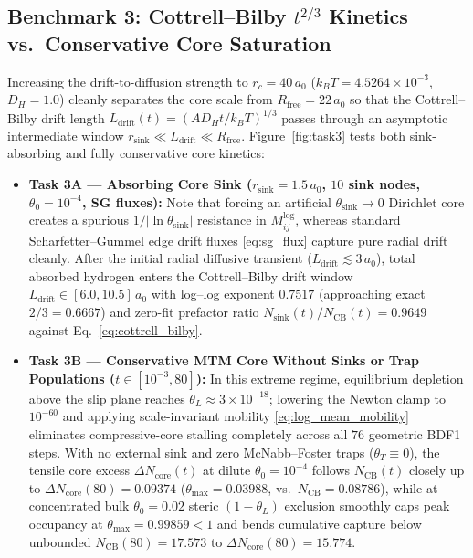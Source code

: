 \documentclass[11pt,a4paper]{article}
\begin{document}
\subsection{Benchmark 3: Cottrell--Bilby \texorpdfstring{$t^{2/3}$}{t\^(2/3)} Kinetics vs.\ Conservative Core Saturation}
\label{subsec:bench_task3}

Increasing the drift-to-diffusion strength to $r_c = 40\,a_0$ ($k_B T = 4.5264 \times 10^{-3}$, $D_H = 1.0$) cleanly separates the core scale from $R_{\text{free}} = 22\,a_0$ so that the Cottrell--Bilby drift length $L_{\text{drift}}(t) = (A D_H t / k_B T)^{1/3}$ passes through an asymptotic intermediate window $r_{\text{sink}} \ll L_{\text{drift}} \ll R_{\text{free}}$. Figure~\ref{fig:task3} tests both sink-absorbing and fully conservative core kinetics:
\begin{itemize}[nosep]
  \item \textbf{Task 3A --- Absorbing Core Sink ($r_{\text{sink}} = 1.5\,a_0$, $10$ sink nodes, $\theta_0 = 10^{-4}$, SG fluxes):} Note that forcing an artificial $\theta_{\text{sink}} \to 0$ Dirichlet core creates a spurious $1/|\ln\theta_{\text{sink}}|$ resistance in $M_{ij}^{\text{log}}$, whereas standard Scharfetter--Gummel edge drift fluxes \eqref{eq:sg_flux} capture pure radial drift cleanly. After the initial radial diffusive transient ($L_{\text{drift}} \lesssim 3\,a_0$), total absorbed hydrogen enters the Cottrell--Bilby drift window $L_{\text{drift}} \in [6.0, 10.5]\,a_0$ with log--log exponent \textbf{$0.7517$} (approaching exact $2/3 = 0.6667$) and zero-fit prefactor ratio \textbf{$N_{\text{sink}}(t)/N_{\text{CB}}(t) = 0.9649$} against Eq.~\eqref{eq:cottrell_bilby}.
  \item \textbf{Task 3B --- Conservative MTM Core Without Sinks or Trap Populations ($t \in [10^{-3}, 80]$):} In this extreme regime, equilibrium depletion above the slip plane reaches $\theta_L \approx 3 \times 10^{-18}$; lowering the Newton clamp to $10^{-60}$ and applying scale-invariant mobility \eqref{eq:log_mean_mobility} eliminates compressive-core stalling completely across all $76$ geometric BDF1 steps. With no external sink and zero McNabb--Foster traps ($\theta_T \equiv 0$), the tensile core excess $\Delta N_{\text{core}}(t)$ at dilute $\theta_0 = 10^{-4}$ follows $N_{\text{CB}}(t)$ closely up to $\Delta N_{\text{core}}(80) = 0.09374$ ($\theta_{\max} = 0.03988$, vs.\ $N_{\text{CB}} = 0.08786$), while at concentrated bulk $\theta_0 = 0.02$ steric $(1-\theta_L)$ exclusion smoothly caps peak occupancy at \textbf{$\theta_{\max} = 0.99859 < 1$} and bends cumulative capture below unbounded $N_{\text{CB}}(80) = 17.573$ to \textbf{$\Delta N_{\text{core}}(80) = 15.774$}.
\end{itemize}
\end{document}
